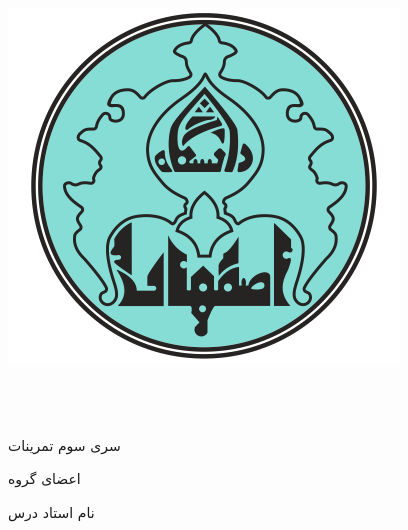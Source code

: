 \documentclass[11pt]{article}
\begin{document}


\begin{center}

    \includegraphics[scale=0.2]{./UILogo.png}

    \University \\
    \Department\\


    \begin{large}
        \vspace{0.5cm}

    \end{large}

    \vspace{1cm}
    \begin{latin}
        {\Large\textbf\EnglishCourseTitle}
    \end{latin}
    \begin{center}
        \CourseName
    \end{center}

    \vspace{1cm}
    {\large{سری سوم تمرینات}}\\
    \vspace{0.25cm}
    {\large\textbf{\courseSemester}}

    \vspace{1.25cm}

    {اعضای گروه}\\
    \begin{spacing}{1.5}
        {{\GroupeMembers}}
    \end{spacing}

    \vspace{1.25cm}


    \vspace{0.5cm}
    {نام استاد درس}\\[0.5em]
    {\large\textbf{\CourseProfessor}}

    \vspace{1.2cm}

\end{center}
\pagebreak
\end{document}
